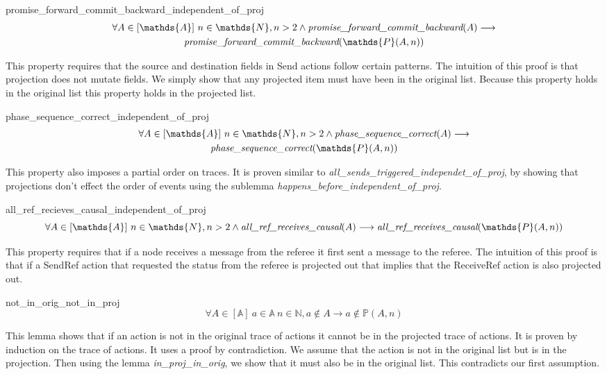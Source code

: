 \documentclass[runningheads]{llncs}
\newcommand{\action}{\mathds{A}}
\newcommand{\listaction}{[\action]}
\newcommand{\projectsize}[2]{\mathds{P}(#1, #2)}
\newcommand{\pfcb}[1]{\emph{promise\_forward\_commit\_backward}(#1)}
\newcommand{\psc}[1]{\emph{phase\_sequence\_correct}(#1)}
\newcommand{\allrrc}[1]{\emph{all\_ref\_receives\_causal}(#1)}
\begin{document}
\begin{lemma}{promise\_forward\_commit\_backward\_independent\_of\_proj}
\begin{multline*}
\forall A \in \listaction\ n \in \mathds{N}, n > 2 \wedge \pfcb{A} \longrightarrow \\
\pfcb{\projectsize{A}{n}} 
\end{multline*}
\end{lemma}
This property requires that the source and destination fields in Send actions follow certain patterns. The intuition of this proof is that projection does not mutate fields. We simply show that any projected item must have been in the original list. Because this property holds in the original list this property holds in the projected list.

\begin{lemma}{phase\_sequence\_correct\_independent\_of\_proj}
\begin{multline*}
\forall A \in \listaction\ n \in \mathds{N}, n > 2 \wedge \psc{A} \longrightarrow \\
\psc{\projectsize{A}{n}}
\end{multline*}
\end{lemma}
This property also imposes a partial order on traces. It is proven similar to \emph{all\_sends\_triggered\_independet\_of\_proj}, by showing that projections don't effect the order of events using the sublemma \emph{happens\_before\_independent\_of\_proj}. 

\begin{lemma}{all\_ref\_recieves\_causal\_independent\_of\_proj}
$$ \forall A \in \listaction\ n \in \mathds{N}, n > 2 \wedge \allrrc{A} \longrightarrow \allrrc{\projectsize{A}{n}} $$
\end{lemma}
This property requires that if a node receives a message from the referee it first sent a message to the referee. The intuition of this proof is that if a SendRef action that requested the status from the referee is projected out that implies that the ReceiveRef action is also projected out.

\begin{lemma}{not\_in\_orig\_not\_in\_proj}
$$ \forall A \in \listaction\ a \in \action\ n \in \mathds{N}, a \notin A  \longrightarrow a \notin \projectsize{A}{n} $$
\end{lemma}
This lemma shows that if an action is not in the original trace of actions it cannot be in the projected trace of actions. It is proven by induction on the trace of actions. It uses a proof by contradiction. We assume that the action is not in the original list but is in the projection. Then using the lemma \emph{in\_proj\_in\_orig}, we show that it must also be in the original list. This contradicts our first assumption.
\end{document}
